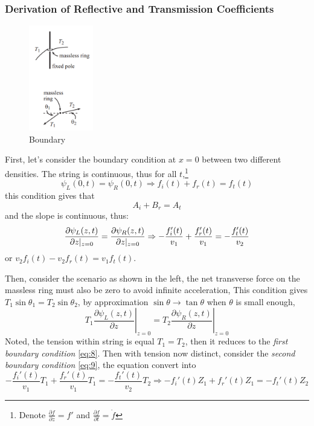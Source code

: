 \documentclass[UTF8]{book}
\begin{document}
\subsubsection{Derivation of Reflective and Transmission Coefficients}
\begin{figure}
  \vspace{-20pt}  
  \begin{center}
    \includegraphics[width=0.25\textwidth]{Figure/4.PNG}
  \end{center}
  \vspace{-20pt}    
  \caption{Boundary}
  \vspace{-0pt} 
\end{figure}
First, let's consider the boundary condition at $x=0$ between two different densities. The string is continuous, thus for all $t$,\footnote{Denote $\frac{\partial f}{\partial z}=f'$ and $\frac{\partial f}{\partial t}=\dot{f}$} 
\begin{equation}\label{eq:8}
\psi _L(0,t)=\psi _R(0,t)\Rightarrow f_{i}(t)+f_{r}(t)=f_{t}(t)
\end{equation}
this condition gives that
\begin{equation}\label{eq:10}
A_i+B_r=A_t
\end{equation}
and the slope is continuous, thus:
\begin{equation}\label{eq:9}
{\partial \psi _L(z,t)\over \partial z|_{z=0}}={\partial \psi _R(z,t)\over \partial z|_{z=0} }\Rightarrow -\frac{f_i'(t)}{v_1}+\frac{f_r'(t)}{v_1}=-\frac{f_t'(t)}{v_2}
\end{equation}
or $v_2f_i(t)-v_2f_r(t)=v_1f_t(t)$.

Then, consider the scenario as shown in the left, the net transverse force on the massless ring must also be zero to avoid infinite acceleration, This condition gives $T_1\sin \theta_1=T_2\sin \theta_2$, by approximation $\sin \theta \to \tan \theta$ when $\theta$ is small enough,
\[T_1\left.\frac{\partial \psi _L(z,t)}{\partial z}\right|_{z=0}=T_2\left.\frac{\partial \psi _R(z,t)}{\partial z}\right|_{z=0}\]
Noted, the tension within string is equal $T_1=T_2$, then it reduces to the \emph{first boundary condition} \eqref{eq:8}. Then with tension now distinct, consider the \emph{second boundary condition} \eqref{eq:9}, the equation convert into
\[-\frac{f_i'(t)}{v_1}T_1+\frac{f_r'(t)}{v_1}T_1=-\frac{f_t'(t)}{v_2}T_2\Rightarrow -f_i'(t)Z_1+f_r'(t)Z_1=-f_t'(t)Z_2\]
\end{document}
